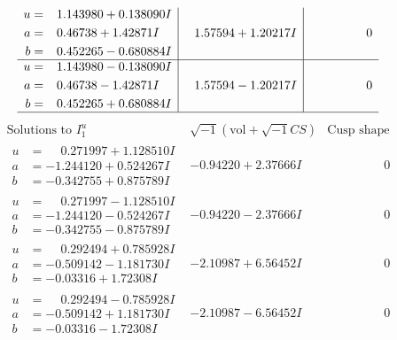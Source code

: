 \documentclass[1p]{elsarticle_modified}
\theoremstyle{definition}
\newcommand{\I}{\sqrt{-1}}
\begin{document}
$$\begin{array}{c|c|c}
\begin{aligned}
u &= \phantom{-}1.143980 + 0.138090 I \\
a &= \phantom{-}0.46738 + 1.42871 I \\
b &= \phantom{-}0.452265 - 0.680884 I\end{aligned}
 & \phantom{-}1.57594 + 1.20217 I & \phantom{-0.000000 } 0 \\ \hline\begin{aligned}
u &= \phantom{-}1.143980 - 0.138090 I \\
a &= \phantom{-}0.46738 - 1.42871 I \\
b &= \phantom{-}0.452265 + 0.680884 I\end{aligned}
 & \phantom{-}1.57594 - 1.20217 I & \phantom{-0.000000 } 0\\
 \hline 
 \end{array}$$\newpage$$\begin{array}{c|c|c}  
\text{Solutions to }I^u_{1}& \I (\text{vol} + \sqrt{-1}CS) & \text{Cusp shape}\\
 \hline 
\begin{aligned}
u &= \phantom{-}0.271997 + 1.128510 I \\
a &= -1.244120 + 0.524267 I \\
b &= -0.342755 + 0.875789 I\end{aligned}
 & -0.94220 + 2.37666 I & \phantom{-0.000000 } 0 \\ \hline\begin{aligned}
u &= \phantom{-}0.271997 - 1.128510 I \\
a &= -1.244120 - 0.524267 I \\
b &= -0.342755 - 0.875789 I\end{aligned}
 & -0.94220 - 2.37666 I & \phantom{-0.000000 } 0 \\ \hline\begin{aligned}
u &= \phantom{-}0.292494 + 0.785928 I \\
a &= -0.509142 - 1.181730 I \\
b &= -0.03316 + 1.72308 I\end{aligned}
 & -2.10987 + 6.56452 I & \phantom{-0.000000 } 0 \\ \hline\begin{aligned}
u &= \phantom{-}0.292494 - 0.785928 I \\
a &= -0.509142 + 1.181730 I \\
b &= -0.03316 - 1.72308 I\end{aligned}
 & -2.10987 - 6.56452 I & \phantom{-0.000000 } 0 \\ \hline\begin{aligned}

\end{aligned}
\end{array}$$
\end{document}
